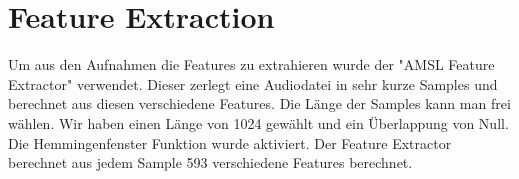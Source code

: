 \section{Feature Extraction}
Um aus den Aufnahmen die Features zu extrahieren wurde der "AMSL Feature Extractor" verwendet. Dieser zerlegt eine Audiodatei in sehr kurze Samples und berechnet aus diesen verschiedene Features. Die Länge der Samples kann man frei wählen. Wir haben einen Länge von 1024 %
gewählt und ein Überlappung von Null. Die Hemmingenfenster Funktion wurde aktiviert. Der Feature Extractor berechnet aus jedem Sample 593 verschiedene Features berechnet. 
